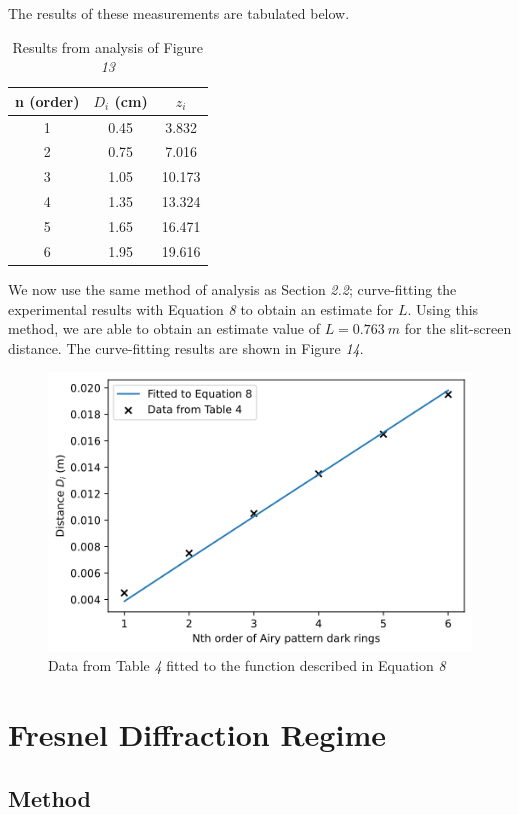 \documentclass[a4paper]{article}
\begin{document}
The results of these measurements are tabulated below.

\begin{table}[h!]
\centering
\begin{tabular}{ccc}
\hline
n (order) & $D_i$ (cm) & $z_i$\\ \hline
1 & 0.45 & 3.832 \\
2 & 0.75 & 7.016 \\
3 & 1.05 & 10.173 \\
4 & 1.35 & 13.324 \\
5 & 1.65 & 16.471 \\
6 & 1.95 & 19.616 \\
\end{tabular}
\caption{\label{tab:pinhole_table}Results from analysis of Figure \emph{13}}
\end{table}

We now use the same method of analysis as Section \emph{2.2}; curve-fitting the experimental results with Equation \emph 8 to obtain an estimate for $L$. Using this method, we are able to obtain an estimate value of $L=0.763\ m$ for the slit-screen distance. The curve-fitting results are shown in Figure \emph{14}.

\begin{figure}[h!]
\centerline{\includegraphics[scale=0.7]{pinhole_plot.png}}
\caption{Data from Table \emph 4 fitted to the function described in Equation \emph 8}
\label{fig:pinhole_plot}
\end{figure}
\newpage
\section{Fresnel Diffraction Regime}
\subsection{Method}
\end{document}
